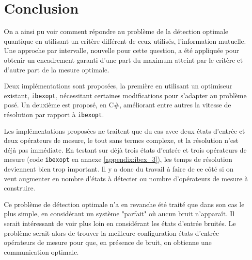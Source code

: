 \chapter{Conclusion}


On a ainsi pu voir comment répondre au problème de la détection optimale quantique en utilisant un critère différent de ceux utilisés, l'information mutuelle. Une approche par intervalle, nouvelle pour cette question, a été appliquée pour obtenir un encadrement garanti d'une part du maximum atteint par le critère et d'autre part de la mesure optimale.

\medbreak

Deux implémentations sont proposées, la première en utilisant un optimiseur existant, \texttt{ibexopt}, nécessitant certaines modifications pour s'adapter au problème posé. Un deuxième est proposé, en C\#, améliorant entre autres la vitesse de résolution par rapport à \texttt{ibexopt}.

\medbreak

Les implémentations proposées ne traitent que du cas avec deux états d'entrée et deux opérateurs de mesure, le tout sans termes complexe, et la résolution n'est déjà pas immédiate. En testant sur déjà trois états d'entrée et trois opérateurs de mesure (code \texttt{ibexopt} en annexe \ref{appendix:ibex_3}), les temps de résolution deviennent bien trop important. Il y a donc du travail à faire de ce côté si on veut augmenter en nombre d'états à détecter ou nombre d'opérateurs de mesure à construire. 


\medbreak

Ce problème de détection optimale n'a en revanche été traité que dans son cas le plus simple, en considérant un système "parfait" où aucun bruit n'apparaît. Il serait intéressant de voir plus loin en considérant les états d'entrée bruités. Le problème serait alors de trouver la meilleure configuration états d'entrée - opérateurs de mesure pour que, en présence de bruit, on obtienne une communication optimale.